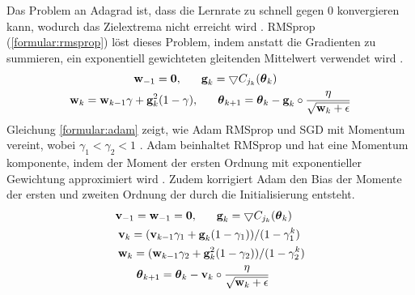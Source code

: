 Das Problem an Adagrad ist, dass die Lernrate zu schnell gegen 0 konvergieren kann, wodurch das Zielextrema nicht erreicht wird \cite{bengio2017deep}.
RMSprop \cite{hinton2012neural} (\ref{formular:rmsprop}) löst dieses Problem, indem anstatt die Gradienten zu summieren, ein
exponentiell gewichteten gleitenden Mittelwert verwendet wird \cite{bengio2017deep}.
\begin{align}
    \label{formular:rmsprop}
    \textbf{w}_{-1} = \textbf{0}, \hspace{0.6cm}
    \textbf{g}_k = \bigtriangledown C_{j_k}(\boldsymbol\theta_k) \hspace{2.3cm} \nonumber\\
    \textbf{w}_k = \textbf{w}_{k-1}\gamma + \textbf{g}_k^2 (1-\gamma), \hspace{0.6cm}
    \boldsymbol\theta_{k+1} = \boldsymbol\theta_k - \textbf{g}_k \circ \frac{\eta}{\sqrt{\textbf{w}_k + \epsilon}}
\end{align}
Gleichung \ref{formular:adam} zeigt, wie Adam RMSprop und SGD mit Momentum vereint, wobei $\gamma_1 < \gamma_2 < 1$ \cite{kingma2014adam}.
Adam beinhaltet RMSprop und hat eine Momentum komponente, indem der Moment der ersten Ordnung mit exponentieller Gewichtung approximiert wird \cite{bengio2017deep}.
Zudem korrigiert Adam den Bias der Momente der ersten und zweiten Ordnung der durch die Initialisierung entsteht.
\begin{align}
    \label{formular:adam}
    \textbf{v}_{-1} = \textbf{w}_{-1} = \textbf{0}, \hspace{0.6cm}
    \textbf{g}_k = \bigtriangledown C_{j_k}(\boldsymbol\theta_k) \hspace{0.4cm} \nonumber\\
    \textbf{v}_k = (\textbf{v}_{k-1}\gamma_1 + \textbf{g}_k (1-\gamma_1))/(1 - \gamma_1^k) \hspace{0.15cm} \nonumber\\
    \textbf{w}_k = (\textbf{w}_{k-1}\gamma_2 + \textbf{g}_k^2 (1-\gamma_2))/(1 - \gamma_2^k) \nonumber\\
    \boldsymbol\theta_{k+1} = \boldsymbol\theta_k - \textbf{v}_k \circ \frac{\eta}{\sqrt{\textbf{w}_k + \epsilon}} \hspace{1.1cm}
\end{align}